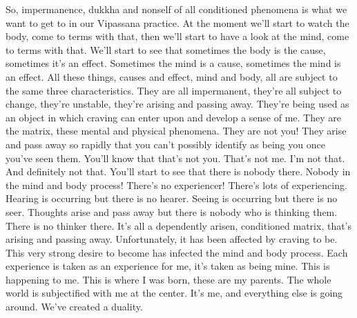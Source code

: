\documentclass[letterpaper,10pt,english]{sphinxmanual}
\begin{document}
\sphinxAtStartPar
So, impermanence, dukkha and non\sphinxhyphen{}self of all conditioned phenomena
  is what we want to get to in our Vipassana practice. At the moment we’ll
start to watch the body, come to terms with that, then we’ll start to have a
look at the mind, come to terms with that. We’ll start to see that sometimes
the  body  is  the  cause,  sometimes  it’s  an  effect.  Sometimes  the  mind  is  a
cause, sometimes the mind is an effect. All these things, causes and effect,
mind and body, all are subject to the same three characteristics. They are all
impermanent, they’re all subject to change, they’re unstable, they’re arising
and  passing  away.  They’re  being  used  as  an  object  in  which  craving  can
enter upon and develop a sense of me. They are the matrix, these mental and
physical phenomena. They are not you! They arise and pass away so rapidly
that you can’t possibly identify as being you once you’ve seen them. You’ll
know  that  that’s  not  you.  That’s  not  me.  I’m  not  that. And  definitely  not
that. You’ll start to see that there is nobody there. Nobody in the mind and
body process! There’s no experiencer! There’s lots of experiencing. Hearing
is occurring but there is no hearer. Seeing is occurring but there is no seer.
Thoughts  arise  and  pass  away  but  there  is  nobody  who  is  thinking  them.
There is no thinker there. It’s all a dependently arisen, conditioned matrix,
that’s arising and passing away. Unfortunately, it has been affected by craving to be. This very strong desire to become has infected the mind and body
process. Each experience is taken as an experience for me, it’s taken as being
mine. This is happening to me. This is where I was born, these are my parents.  The  whole  world  is  subjectified  with  me  at  the  center.  It’s  me,  and
everything else is going around. We’ve created a duality.
\end{document}
